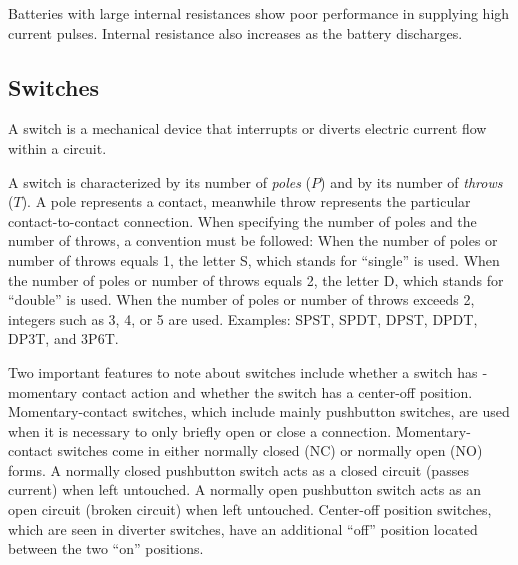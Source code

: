 \documentclass[../../document]{subfiles}
\begin{document}
Batteries with large internal resistances show poor performance in supplying
high current pulses. Internal resistance also increases as the battery
discharges. \cite{practical_electronics}

\subsection{Switches}
A switch is a mechanical device that interrupts or diverts electric current
flow within a circuit. \cite{practical_electronics}

A switch is characterized by its number of \emph{poles} (\(P\)) and by its
number of \emph{throws} (\(T\)). A pole represents a contact, meanwhile throw
represents the particular contact-to-contact connection. When specifying the
number of poles and the number of throws, a convention must be followed: When
the number of poles or number of throws equals 1, the letter S, which stands
for \enquote{single} is used. When the number of poles or number of throws
equals 2, the letter D, which stands for \enquote{double} is used. When the
number of poles or number of throws exceeds 2, integers such as 3, 4, or 5 are
used. Examples: SPST, SPDT, DPST, DPDT, DP3T, and 3P6T.
\cite{practical_electronics}

Two important features to note about switches include whether a switch has ­
momentary contact action and whether the switch has a center-off position.
Momentary-contact switches, which include mainly pushbutton switches, are used
when it is necessary to only briefly open or close a connection.
Momentary-contact switches come in either normally closed (NC) or normally open
(NO) forms. A normally closed pushbutton switch acts as a closed circuit
(passes current) when left­ untouched. A normally open pushbutton switch acts
as an open circuit (broken circuit) when left untouched. Center-off position
switches, which are seen in diverter switches, have an additional \enquote{off}
position located between the two \enquote{on} positions.
\cite{practical_electronics}
 
\end{document}
